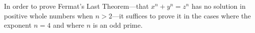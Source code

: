 In order to prove Fermat's Last Theorem—that $x^n + y^n = z^n$ has no solution in positive whole numbers when $n > 2$—it suffices to prove it in the cases where the exponent $n = 4$ and where $n$ is an odd prime.
